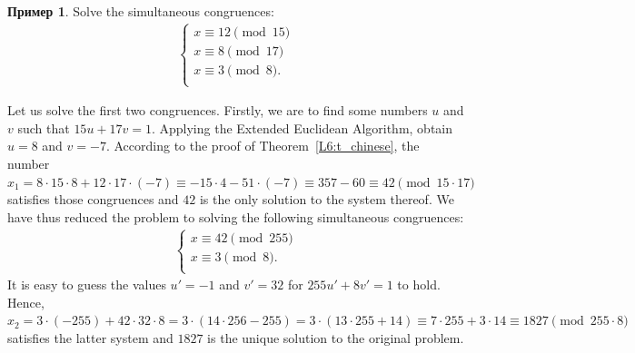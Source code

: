 \documentclass[12pt,notitlepage]{article}
\theoremstyle{plain}
\theoremstyle{definition}
\newtheorem{exm}[thm]{Пример}
\theoremstyle{plain}
\newcommand{\1}{\mathbf{1}}
\newcommand{\0}{\mathbf{0}}
\begin{document}
\begin{exm}
	Solve the simultaneous congruences:
	$$
	\begin{array}{l}
		\begin{cases}
			x \equiv 12 \pmod {15}\\
			x \equiv 8 \pmod {17}\\
			x \equiv 3 \pmod 8.\\
		\end{cases}
	\end{array}
	$$
	
	Let us solve the first two congruences. Firstly, we are to find some numbers $u$ and $v$ such that $15 u + 17 v = 1$. Applying the Extended Euclidean Algorithm, obtain $u = 8$ and $v = -7$. According to the proof of Theorem~\ref{L6:t_chinese}, the number $x_1 = 8 \cdot 15 \cdot 8  + 12 \cdot 17 \cdot (-7) \equiv -15 \cdot 4 - 51 \cdot (-7) \equiv 357 - 60 \equiv 42 \pmod {15 \cdot 17}$ satisfies those congruences and $42$ is the only solution to the system thereof. We have thus reduced the problem to solving the following simultaneous congruences:
	$$
	\begin{array}{l}
		\begin{cases}
			x \equiv 42 \pmod {255}\\
			x \equiv 3 \pmod 8.\\
		\end{cases}
	\end{array}
	$$
	It is easy to guess the values $u' = -1$ and $v' = 32$ for $255u' + 8v' = 1$ to hold. Hence, $x_2 = 3\cdot (-255) + 42 \cdot 32 \cdot 8 = 3\cdot (14 \cdot 256 - 255) = 3 \cdot (13 \cdot 255 + 14) \equiv 7 \cdot 255 + 3 \cdot 14 \equiv 1827 \pmod {255 \cdot 8}$ satisfies the latter system and $1827$ is the unique solution to the original problem.
\end{exm}
\end{document}
